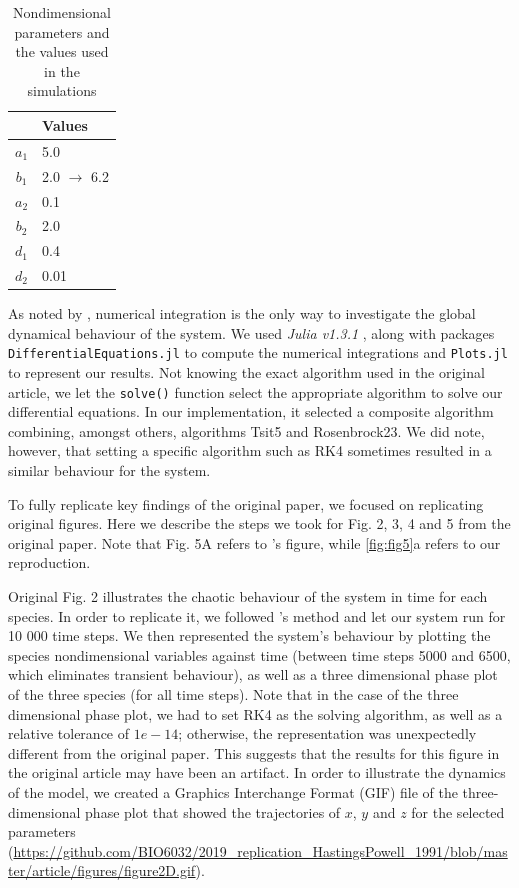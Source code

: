 \begin{table}[!htb]
  \centering
  \caption{Nondimensional parameters and the values used in the simulations}
  \label{tbl:table1}
  \begin{tabular}{c l}
    \hline
    & Values \\
    \hline
    $a_1$ & 5.0 \\
    $b_1$ & 2.0 $\rightarrow$ 6.2 \\
    $a_2$ & 0.1 \\
    $b_2$ & 2.0 \\
    $d_1$ & 0.4 \\
    $d_2$ & 0.01 \\
    \hline
  \end{tabular}
\end{table}

As noted by \citeauthor{hastings1991}, numerical integration is the only way to investigate the
global dynamical behaviour of the system.
We used \textit{Julia v1.3.1} \citep{bezanson2017}, along with packages \verb| DifferentialEquations.jl|
\citep{rackauckas2017} to compute the numerical integrations and \verb|Plots.jl| to represent
our results. 
Not knowing the exact algorithm used in the original article, we let the \verb|solve()| function 
select the appropriate algorithm to solve our differential equations.
In our implementation, it selected a composite algorithm combining, amongst others,
algorithms Tsit5 and Rosenbrock23.
We did note, however, that setting a specific algorithm such as RK4 sometimes resulted in a similar 
behaviour for the system. 

To fully replicate key findings of the original paper, we focused on replicating
original figures.
Here we describe the steps we took for Fig. 2, 3, 4 and 5 from the original paper.
Note that Fig. 5A refers to \citeauthor{hastings1991}'s figure, while \autoref{fig:fig5}a
refers to our reproduction.

Original Fig. 2 illustrates the chaotic behaviour of the system in time for each species.
In order to replicate it, we followed \citeauthor{hastings1991}'s method and let our system
run for 10 000 time steps.
We then represented the system's behaviour by plotting the species nondimensional
variables against time (between time steps 5000 and 6500, which eliminates transient
behaviour), as well as a three dimensional phase plot of the three species (for all time
steps). Note that in the case of the three dimensional phase plot, we had to set RK4 as
the solving algorithm, as well as a relative tolerance of $1e-14$; otherwise, the
representation was unexpectedly different from the original paper.
This suggests that the results for this figure in the original article may have been an
artifact.
In order to illustrate the dynamics of the model, we created a Graphics Interchange Format
(GIF) file of the three-dimensional phase plot that showed the trajectories of $x$, $y$
and $z$ for the selected parameters (\url{https://github.com/BIO6032/2019_replication_HastingsPowell_1991/blob/master/article/figures/figure2D.gif}).

